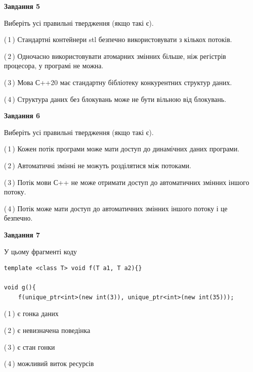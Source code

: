 \documentclass[12pt, ukrainian]{article}
\begin{document}
\begin {large}
{\begin{center}
\textbf{Завдання 5}
\end{center}

Виберіть усі правильні твердження (якщо такі є).\par
\vspace{2mm}

(\,1\,) Стандартні контейнери stl безпечно використовувати з кількох потоків.%

(\,2\,) Одночасно використовувати атомарних змінних більше, ніж регістрів процесора, у програмі не можна.%

(\,3\,) Мова С++20 має стандартну бібліотеку конкурентних структур даних.%

(\,4\,) Структура даних без блокувань може не бути вільною від блокувань.%
\newpage


\begin{center}
\textbf{Завдання 6}
\end{center}

Виберіть усі правильні твердження (якщо такі є).\par
\vspace{2mm}

(\,1\,) Кожен потік програми може мати доступ до динамічних даних програми.%

(\,2\,) Автоматичні змінні не можуть розділятися між потоками.%

(\,3\,) Потік мови С++ не може отримати доступ до автоматичних змінних іншого потоку.%

(\,4\,) Потік може мати доступ до автоматичних змінних іншого потоку і це безпечно.%


\begin{center}
\textbf{Завдання 7}
\end{center}

У цьому фрагменті коду
\begin{verbatim}
template <class T> void f(T a1, T a2){}

void g(){
    f(unique_ptr<int>(new int(3)), unique_ptr<int>(new int(35)));
\end{verbatim}

(\,1\,) є гонка даних%

(\,2\,) є невизначена поведінка%

(\,3\,) є стан гонки%

(\,4\,) можливий виток ресурсів%

}
\end {large}

\vspace{4mm}
\newpage
\end{document}
